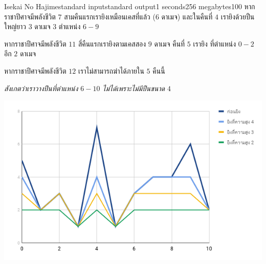 \documentclass[11pt,a4paper]{article}
\begin{document}
\begin{problem}{Isekai No Hajime}{standard input}{standard output}{1 seconds}{256 megabytes}{100}
หากราชาปีศาจมีพลังชีวิต $7$ สามคืนแรกเรายิงเหมือนเคสที่แล้ว ($6$ ดาเมจ) และในคืนที่ $4$ เรายิงด้วยปืนใหญ่ยาว $3$ ดาเมจ $3$ ตำแหน่ง $6 - 9$

หากราชาปีศาจมีพลังชีวิต $11$ สี่คืนแรกเรายิงตามเคสสอง $9$ ดาเมจ คืนที่ $5$ เรายิง ที่ตำแหน่ง $0 - 2$ อีก $2$ ดาเมจ

หากราชาปีศาจมีพลังชีวิต $12$ เราไม่สามารถฆ่าได้ภายใน $5$ คืนนี้

\textit{สังเกตว่าเราวางปืนที่ตำแหน่ง $6 - 10$ ไม่ได้เพราะไม่มีปืนขนาด $4$}

\includegraphics[width=\textwidth]{chart.png}

\end{problem}
\end{document}
